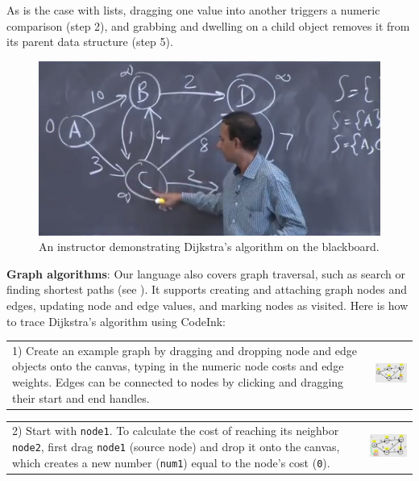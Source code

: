 As is the case with lists, dragging one value into another triggers a
numeric comparison (step 2), and grabbing and dwelling on a child object
removes it from its parent data structure (step 5).

\begin{figure}
\begin{center}
\includegraphics[width=0.7\columnwidth]{img/6006/dijkstra.png}
\end{center}

\vspace{-0.75em}

\caption{An instructor demonstrating Dijkstra's algorithm on the
blackboard.}
\vspace{-0.75em}

\label{fig:example-dijkstra}
\end{figure}


\noindent \textbf{Graph algorithms}: Our language also covers graph
traversal, such as search or finding shortest paths (see
). It supports creating and attaching graph
nodes and edges, updating node and edge values, and marking nodes as
visited. Here is how to trace Dijkstra's algorithm using CodeInk:

\noindent \begin{tabular}{m{4.2cm} m{3.8cm}}
1) Create an example graph by dragging and dropping node and edge
objects onto the canvas, typing in the numeric node costs and edge weights.
Edges can be connected to nodes by clicking and dragging their start and end
handles.
& \includegraphics[width=3.8cm]{img/examples/dijkstra-1.png}
\end{tabular}

\noindent \begin{tabular}{m{4.2cm} m{3.8cm}}
2) Start with \texttt{node1}. To calculate the
cost of reaching its neighbor \texttt{node2},
first drag \texttt{node1} (source node) and drop it onto the canvas, which
creates a new number (\texttt{num1}) equal to the node's cost (\texttt{0}).
& \includegraphics[width=3.8cm]{img/examples/dijkstra-2.png}
\end{tabular}

